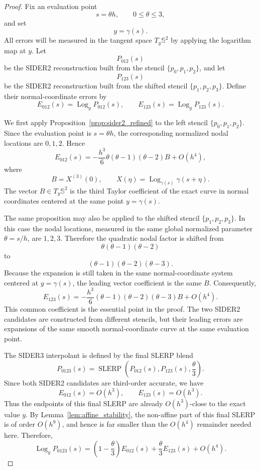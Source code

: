 \documentclass[a4paper,11pt]{article}
\newcommand{\bS}{\mathbb{S}}
\newcommand{\Log}{\operatorname{Log}}
\newcommand{\SLERP}{\operatorname{SLERP}}
\numberwithin{equation}{section}
\begin{document}
\begin{proof}
Fix an evaluation point
\[
        s=\theta h,\qquad 0\leq\theta\leq3,
\]
and set
\[
        y=\gamma(s).
\]
All errors will be measured in the tangent space \(T_y\bS^2\) by applying the
logarithm map at \(y\).  Let
\[
        P_{012}(s)
\]
be the SIDER2 reconstruction built from the stencil
\(\{p_0,p_1,p_2\}\), and let
\[
        P_{123}(s)
\]
be the SIDER2 reconstruction built from the shifted stencil
\(\{p_1,p_2,p_3\}\).  Define their normal-coordinate errors by
\[
        E_{012}(s)=\Log_y P_{012}(s),
        \qquad
        E_{123}(s)=\Log_y P_{123}(s).
\]

We first apply Proposition~\ref{prop:sider2_refined} to the left stencil
\(\{p_0,p_1,p_2\}\).  Since the evaluation point is \(s=\theta h\), the
corresponding normalized nodal locations are \(0,1,2\).  Hence
\begin{equation}
\label{eq:left_sider2_error}
E_{012}(s)
=
-\frac{h^3}{6}
\theta(\theta-1)(\theta-2)B
+O(h^4),
\end{equation}
where
\[
        B=X^{(3)}(0),
        \qquad
        X(\eta)=\Log_{\gamma(s)}\gamma(s+\eta).
\]
The vector \(B\in T_y\bS^2\) is the third Taylor coefficient of the exact
curve in normal coordinates centered at the same point \(y=\gamma(s)\).

The same proposition may also be applied to the shifted stencil
\(\{p_1,p_2,p_3\}\).  In this case the nodal locations, measured in the same
global normalized parameter \(\theta=s/h\), are \(1,2,3\).  Therefore the
quadratic nodal factor is shifted from
\[
        \theta(\theta-1)(\theta-2)
\]
to
\[
        (\theta-1)(\theta-2)(\theta-3).
\]
Because the expansion is still taken in the same normal-coordinate system
centered at \(y=\gamma(s)\), the leading vector coefficient is the same \(B\).
Consequently,
\begin{equation}
\label{eq:right_sider2_error}
E_{123}(s)
=
-\frac{h^3}{6}
(\theta-1)(\theta-2)(\theta-3)B
+O(h^4).
\end{equation}
This common coefficient is the essential point in the proof.  The two SIDER2
candidates are constructed from different stencils, but their leading errors
are expansions of the same smooth normal-coordinate curve at the same
evaluation point.

The SIDER3 interpolant is defined by the final SLERP blend
\[
        P_{0123}(s)
        =
        \SLERP\left(
        P_{012}(s),P_{123}(s),\frac{\theta}{3}
        \right).
\]
Since both SIDER2 candidates are third-order accurate, we have
\[
        E_{012}(s)=O(h^3),
        \qquad
        E_{123}(s)=O(h^3).
\]
Thus the endpoints of this final SLERP are already \(O(h^3)\)-close to the
exact value \(y\).  By Lemma~\ref{lem:affine_stability}, the non-affine part
of this final SLERP is of order \(O(h^9)\), and hence is far smaller than the
\(O(h^4)\) remainder needed here.  Therefore,
\begin{equation}
\label{eq:sider3_affine_error}
\Log_y P_{0123}(s)
=
\left(1-\frac{\theta}{3}\right)E_{012}(s)
+
\frac{\theta}{3}E_{123}(s)
+
O(h^4).
\end{equation}


\end{proof}
\end{document}
